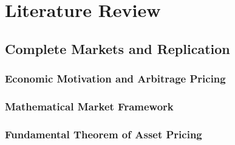 
\section{Literature Review}
\label{sec:literature_review}


\subsection{Complete Markets and Replication}
\label{subsec:complete_markets}

\subsubsection{Economic Motivation and Arbitrage Pricing}

%


\subsubsection{Mathematical Market Framework}

%


\subsubsection{Fundamental Theorem of Asset Pricing}

%


